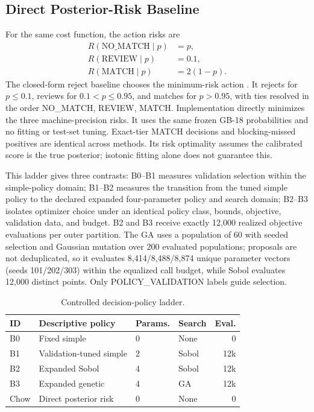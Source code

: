 \documentclass[conference]{IEEEtran}
\begin{document}
\subsection{Direct Posterior-Risk Baseline}
For the same cost function, the action risks are
\begin{align}
R(\mathrm{NO\_MATCH}\mid p)&=p,\\
R(\mathrm{REVIEW}\mid p)&=0.1,\\
R(\mathrm{MATCH}\mid p)&=2(1-p).
\end{align}
The closed-form reject baseline chooses the minimum-risk action \cite{chow1970reject}. It rejects for $p\le0.1$, reviews for $0.1<p\le0.95$, and matches for $p>0.95$, with ties resolved in the order NO\_MATCH, REVIEW, MATCH. Implementation directly minimizes the three machine-precision risks. It uses the same frozen GB-18 probabilities and no fitting or test-set tuning. Exact-tier MATCH decisions and blocking-missed positives are identical across methods. Its risk optimality assumes the calibrated score is the true posterior; isotonic fitting alone does not guarantee this.

This ladder gives three contrasts: B0--B1 measures validation selection within the simple-policy domain; B1--B2 measures the transition from the tuned simple policy to the declared expanded four-parameter policy and search domain; B2--B3 isolates optimizer choice under an identical policy class, bounds, objective, validation data, and budget. B2 and B3 receive exactly 12,000 realized objective evaluations per outer partition. The GA uses a population of 60 with seeded selection and Gaussian mutation over 200 evaluated populations; proposals are not deduplicated, so it evaluates 8,414/8,488/8,874 unique parameter vectors (seeds 101/202/303) within the equalized call budget, while Sobol evaluates 12,000 distinct points. Only POLICY\_VALIDATION labels guide selection.

\begin{table}[t]
\caption{Controlled decision-policy ladder.}
\label{tab:policies}
\centering
\begin{tabular}{llllr}
\toprule
ID & Descriptive policy & Params. & Search & Eval.\\
\midrule
B0 & Fixed simple & 0 & None & 0\\
B1 & Validation-tuned simple & 2 & Sobol & 12k\\
B2 & Expanded Sobol & 4 & Sobol & 12k\\
B3 & Expanded genetic & 4 & GA & 12k\\
Chow & Direct posterior risk & 0 & None & 0\\
\bottomrule
\end{tabular}
\end{table}
\end{document}
